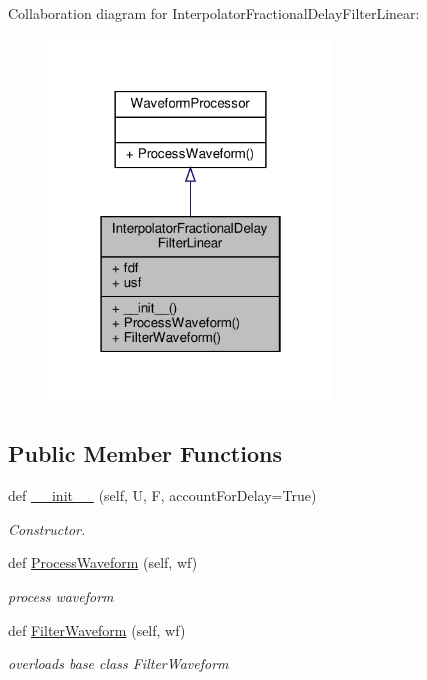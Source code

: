 Collaboration diagram for Interpolator\+Fractional\+Delay\+Filter\+Linear\+:
\nopagebreak
\begin{figure}[H]
\begin{center}
\leavevmode
\includegraphics[width=214pt]{classSignalIntegrity_1_1TimeDomain_1_1Filters_1_1InterpolatorLinear_1_1InterpolatorFractionalDelayFilterLinear__coll__graph}
\end{center}
\end{figure}
\subsection*{Public Member Functions}
\begin{DoxyCompactItemize}
\item 
def \hyperlink{classSignalIntegrity_1_1TimeDomain_1_1Filters_1_1InterpolatorLinear_1_1InterpolatorFractionalDelayFilterLinear_a81150f52975e0ef244e215c5faf0291e}{\+\_\+\+\_\+init\+\_\+\+\_\+} (self, U, F, account\+For\+Delay=True)
\begin{DoxyCompactList}\small\item\em Constructor. \end{DoxyCompactList}\item 
def \hyperlink{classSignalIntegrity_1_1TimeDomain_1_1Filters_1_1InterpolatorLinear_1_1InterpolatorFractionalDelayFilterLinear_ae09bec195c9cb1d5819e73b7be169b11}{Process\+Waveform} (self, wf)
\begin{DoxyCompactList}\small\item\em process waveform \end{DoxyCompactList}\item 
def \hyperlink{classSignalIntegrity_1_1TimeDomain_1_1Filters_1_1InterpolatorLinear_1_1InterpolatorFractionalDelayFilterLinear_a84e73c18250ca4a61482f94ad61e735b}{Filter\+Waveform} (self, wf)
\begin{DoxyCompactList}\small\item\em overloads base class Filter\+Waveform \end{DoxyCompactList}\end{DoxyCompactItemize}


